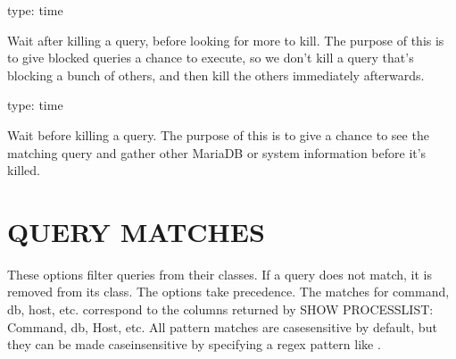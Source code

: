 \documentclass[letterpaper,10pt,english]{sphinxmanual}
\begin{document}
\begin{fulllineitems}
\label{\detokenize{mariadb-kill:cmdoption-mariadb-kill-wait-after-kill}}
type: time

Wait after killing a query, before looking for more to kill.  The purpose of
this is to give blocked queries a chance to execute, so we don’t kill a query
that’s blocking a bunch of others, and then kill the others immediately
afterwards.

\end{fulllineitems}


\begin{fulllineitems}
\label{\detokenize{mariadb-kill:cmdoption-mariadb-kill-wait-before-kill}}
type: time

Wait before killing a query.  The purpose of this is to give
{\hyperref[\detokenize{mariadb-kill:cmdoption-mariadb-kill-execute-command}]{}} a chance to see the matching query and gather other
MariaDB or system information before it’s killed.

\end{fulllineitems}



\section{QUERY MATCHES}
\label{\detokenize{mariadb-kill:query-matches}}
These options filter queries from their classes.  If a query does not
match, it is removed from its class.  The  options take precedence.
The matches for command, db, host, etc. correspond to the columns returned
by SHOW PROCESSLIST: Command, db, Host, etc.  All pattern matches are
case\sphinxhyphen{}sensitive by default, but they can be made case\sphinxhyphen{}insensitive by specifying
a regex pattern like .
\end{document}
